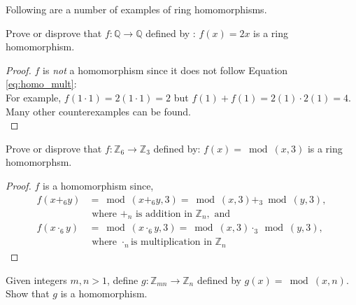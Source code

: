 Following are a number of examples of ring homomorphisms.

\begin{example}\label{example:rings:notHomo}
Prove or disprove that $f:{\mathbb Q}\rightarrow {\mathbb Q}$ defined by : $f(x)=2x$ is a ring homomorphism.

\begin{proof}
$f$ is \emph{not} a homomorphism since it does not follow Equation \ref{eq:homo_mult}:\\
For example, $f(1\cdot1)=2(1\cdot 1)=2$ but $f(1)+f(1)=2(1)\cdot 2(1)=4$.  Many other counterexamples can be found.\\
\end{proof}
\end{example}

\begin{example}\label{example:rings:homo}
Prove or disprove that  $f:{\mathbb Z}_6\rightarrow {\mathbb Z}_3$ defined by: $f(x)=\bmod(x,3)$ is a ring homomorphsm.\\

\begin{proof}
$f$ is a homomorphism since,
\begin{align*}
f(x+_6y)&=\bmod(x+_6y,3)=\bmod(x,3)+_3\bmod(y,3),\\
&\text{ where } +_n \text{ is addition in } {\mathbb Z}_n, \text{ and}\\
f(x\cdot_6y)&=\bmod(x\cdot_6y,3)=\bmod(x,3)\cdot_3\bmod(y,3),\\ &\text{ where } \cdot_n \text{is multiplication in } {\mathbb Z}_n
\end{align*}
\end{proof}
\end{example}

\begin{exercise}\label{exercise:rings:homo}
Given integers $m,n>1$, define $g:{\mathbb Z}_{mn}\rightarrow {\mathbb Z}_n$ defined by $g(x)=\bmod(x,n)$.  Show that $g$ is a homomorphism.
\end{exercise}

